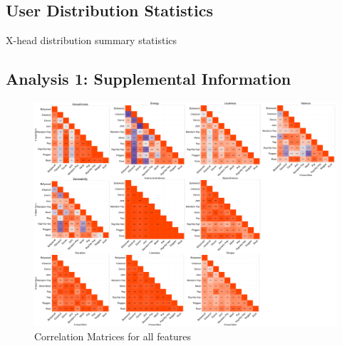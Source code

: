 \documentclass[a4paper]{article}
\begin{document}
\subsection{User Distribution Statistics}
\begin{table}[h!]
\small
\centering
{}%
{\csvlinetotablerow}%
\caption[X-head Distribution Summary Table]{X-head distribution summary statistics}\label{tab:xheadDist}
\end{table}

\subsection{Analysis 1: Supplemental Information}
\begin{figure}[h!]
\includegraphics[width=\linewidth]{correlationSupplemental}
\caption[Correlation Supplemental]{Correlation Matrices for all features}
\end{figure}
\end{document}
